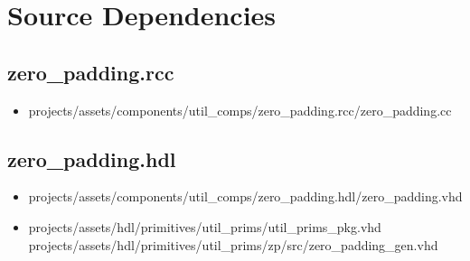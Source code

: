 \documentclass{article}
\def\comp{zero\_padding}
\begin{document}
\section*{Source Dependencies}
\subsection*{\comp.rcc}
\begin{itemize}
	\item projects/assets/components/util\_comps/zero\_padding.rcc/zero\_padding.cc
\end{itemize}
\subsection*{\comp.hdl}
\begin{itemize}
	\item projects/assets/components/util\_comps/zero\_padding.hdl/zero\_padding.vhd
	\item projects/assets/hdl/primitives/util\_prims/util\_prims\_pkg.vhd
	      \subitem projects/assets/hdl/primitives/util\_prims/zp/src/zero\_padding\_gen.vhd
\end{itemize}
\end{document}
